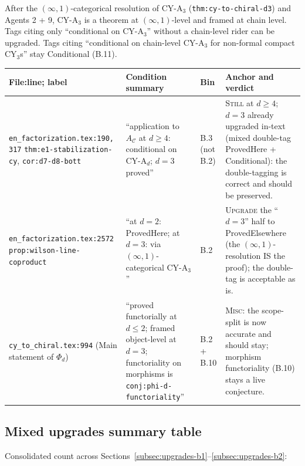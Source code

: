 \documentclass[11pt]{amsart}
\providecommand{\cC}{\mathcal{C}}
\begin{document}
After the $(\infty,1)$-categorical resolution of CY-A$_3$
(\texttt{thm:cy-to-chiral-d3}) and Agents 2 + 9, CY-A$_3$ is a theorem
at $(\infty,1)$-level and framed at chain level. Tags citing only
``conditional on CY-A$_3$'' without a chain-level rider can be
upgraded. Tags citing ``conditional on chain-level CY-A$_3$ for
non-formal compact CY$_3$s'' stay Conditional (B.11).

\begin{longtable}{@{}p{4.2cm}p{3.5cm}p{1.5cm}p{5cm}@{}}
\toprule
File:line; label & Condition summary & Bin & Anchor and verdict \\
\midrule\endhead

\texttt{en\_factorization.tex:190, 317} \newline \texttt{thm:e1-stabilization-cy}, \texttt{cor:d7-d8-bott}
& ``application to $A_\cC$ at $d \geq 4$: conditional on CY-A$_d$; $d = 3$ proved''
& B.3 (not B.2)
& \textsc{Still} at $d \geq 4$; $d = 3$ already upgraded in-text (mixed double-tag ProvedHere + Conditional): the double-tagging is correct and should be preserved. \\

\texttt{en\_factorization.tex:2572} \newline \texttt{prop:wilson-line-coproduct}
& ``at $d=2$: ProvedHere; at $d=3$: via $(\infty,1)$-categorical CY-A$_3$''
& B.2
& \textsc{Upgrade} the ``$d=3$'' half to ProvedElsewhere (the $(\infty,1)$-resolution IS the proof); the double-tag is acceptable as is. \\

\texttt{cy\_to\_chiral.tex:994} \newline (Main statement of $\Phi_d$)
& ``proved functorially at $d \leq 2$; framed object-level at $d = 3$; functoriality on morphisms is \texttt{conj:phi-d-functoriality}''
& B.2 + B.10
& \textsc{Misc}: the scope-split is now accurate and should stay; morphism functoriality (B.10) stays a live conjecture. \\

\bottomrule
\end{longtable}

\subsection{Mixed upgrades summary table}
\label{subsec:upgrades-summary}

Consolidated count across Sections~\ref{subsec:upgrades-b1}--\ref{subsec:upgrades-b2}:
\end{document}

